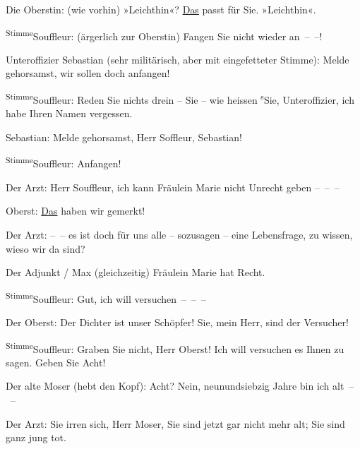 \pstart
           Die Oberstin: (wie vorhin) »Leichthin«? \uline{Das} passt für
               Sie. »Leichthin«.\pend
           
\pstart
           \substVorne{}\textsuperscript{Stimme}\substDazwischen{}Souffleur\substHinten{}: (ärgerlich zur Oberstin) Fangen Sie nicht wieder an – –!\pend
           
\pstart
           Unteroffizier Sebastian (sehr militärisch, aber mit eingefetteter Stimme): Melde
               gehorsamst, wir sollen doch anfangen!\pend
           
\pstart
           \substVorne{}\textsuperscript{Stimme}\substDazwischen{}Souffleur\substHinten{}: Reden Sie nichts drein – Sie – wie heissen \substVorne{}\textsuperscript{s}\substDazwischen{}S\substHinten{}ie, Unteroffizier, ich habe Ihren Namen vergessen.\pend
           
\pstart
           {\pb}Sebastian: Melde gehorsamst, Herr
               Soffleur, Sebastian!\pend
           
\pstart
           \substVorne{}\textsuperscript{Stimme}\substDazwischen{}Souffleur\substHinten{}: Anfangen!\pend
           
\pstart
           Der Arzt: Herr Souffleur, ich kann Fräulein Marie nicht Unrecht geben – – –\pend
           
\pstart
           Oberst: \uline{Das} haben wir gemerkt!\pend
           
\pstart
           Der Arzt: – – es ist doch für uns alle – sozusagen – eine Lebensfrage, zu wissen,
               wieso wir da sind?\pend
           
\pstart
           Der Adjunkt / Max (gleichzeitig) Fräulein Marie hat Recht.\pend
           
\pstart
           \substVorne{}\textsuperscript{Stimme}\substDazwischen{}Souffleur\substHinten{}: Gut, ich will versuchen – – –\pend
           
\pstart
           Der Oberst: Der Dichter ist unser Schöpfer! Sie, mein Herr, sind der Versucher!\pend
           
\pstart
           \substVorne{}\textsuperscript{Stimme}\substDazwischen{}Souffleur\substHinten{}: Graben Sie nicht, Herr Oberst! Ich will versuchen es Ihnen zu sagen. Geben
               Sie Acht!\pend
           
\pstart
           Der alte Moser (hebt den Kopf): Acht? Nein, neunundsiebzig Jahre bin ich alt – –\pend
           
\pstart
           Der Arzt: Sie irren sich, Herr Moser, Sie sind jetzt gar nicht mehr alt; Sie sind
               ganz jung tot.\pend
           
